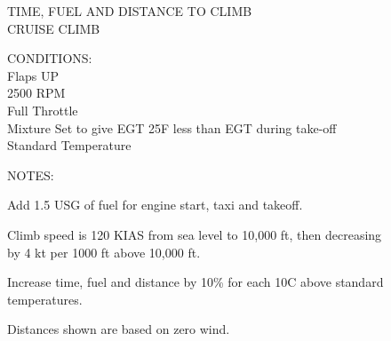 \begin{figure}[t]
\begin{center}
\begin{perfhdr}TIME, FUEL AND DISTANCE TO CLIMB\\
CRUISE CLIMB\\
\end{perfhdr}
\Large
\normalsize
\vspace{5ex}
    \raggedright 
    CONDITIONS:\\
    Flaps UP\\
    2500 RPM\\
    Full Throttle\\
    Mixture Set to give EGT 25\textdegree F less than EGT during take-off\\
    Standard Temperature\\
\hfill

\vspace{\perfnoteskip}
    \raggedright NOTES:
    \begin{enumerate*}
      \item Add 1.5 USG of fuel for engine start, taxi and takeoff.
      \item Climb speed is 120 KIAS from sea level to 10,000 ft, then decreasing by 4 kt per 1000 ft above 10,000 ft.
      \item Increase time, fuel and distance by 10\% for each 10\textdegree C above standard temperatures.
      \item Distances shown are based on zero wind.
      \end{enumerate*}
\vspace{\perfnoteskip}
\settowidth{\colOne}{WEIGHT}
\settowidth{\colTwo}{PRESSURE}
\settowidth{\colThree}{TEMP}
\settowidth{\colFour}{CLIMB}
\settowidth{\colFive}{RATE OF}
\settowidth{\colSix}{TIME}
\settowidth{\colSeven}{USED}
\settowidth{\colEight}{DIST.}


\end{center}
\end{figure}

